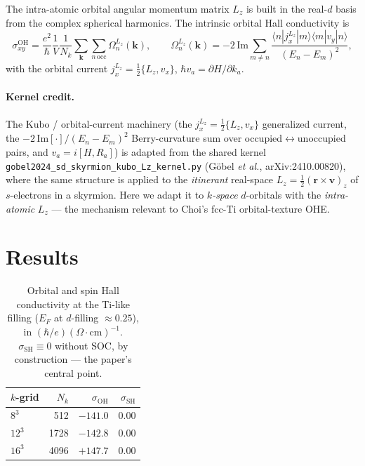 \documentclass[11pt]{article}
\begin{document}
The intra-atomic orbital angular momentum matrix $L_z$ is built in the real-$d$ basis from
the complex spherical harmonics. The intrinsic orbital Hall conductivity is
\begin{equation}
\sigma^{\mathrm{OH}}_{xy}=\frac{e^2}{\hbar}\frac{1}{V}\frac{1}{N_k}
\sum_{\mathbf{k}}\sum_{n\,\mathrm{occ}}\Omega^{L_z}_{n}(\mathbf{k}),\qquad
\Omega^{L_z}_{n}(\mathbf{k})=-2\,\mathrm{Im}\!\!\sum_{m\neq n}
\frac{\langle n|j^{L_z}_x|m\rangle\langle m|v_y|n\rangle}{(E_n-E_m)^2},
\end{equation}
with the orbital current $j^{L_z}_x=\tfrac12\{L_z,v_x\}$, $\hbar v_a=\partial H/\partial k_a$.

\paragraph{Kernel credit.} The Kubo / orbital-current machinery (the
$j^{L_z}_x=\tfrac12\{L_z,v_x\}$ generalized current, the
$-2\,\mathrm{Im}[\cdot]/(E_n-E_m)^2$ Berry-curvature sum over occupied$\leftrightarrow$unoccupied
pairs, and $v_a=i[H,R_a]$) is adapted from the shared kernel
\texttt{gobel2024\_sd\_skyrmion\_kubo\_Lz\_kernel.py} (Göbel \emph{et al.}, arXiv:2410.00820),
where the same structure is applied to the \emph{itinerant} real-space
$L_z=\tfrac12(\mathbf{r}\times\mathbf{v})_z$ of $s$-electrons in a skyrmion. Here we adapt it
to \emph{$k$-space} $d$-orbitals with the \emph{intra-atomic} $L_z$ --- the mechanism relevant
to Choi's fcc-Ti orbital-texture OHE.

\section{Results}
\begin{table}[h]\centering
\begin{tabular}{lrrr}
\toprule
$k$-grid & $N_k$ & $\sigma_{\mathrm{OH}}$ & $\sigma_{\mathrm{SH}}$ \\
\midrule
$8^3$  & 512  & $-141.0$ & $0.00$ \\
$12^3$ & 1728 & $-142.8$ & $0.00$ \\
$16^3$ & 4096 & $+147.7$ & $0.00$ \\
\bottomrule
\end{tabular}
\caption{Orbital and spin Hall conductivity at the Ti-like filling
($E_F$ at $d$-filling $\approx0.25$), in $(\hbar/e)(\Omega\cdot\mathrm{cm})^{-1}$.
$\sigma_{\mathrm{SH}}\equiv0$ without SOC, by construction --- the paper's central point.}
\end{table}
\end{document}
